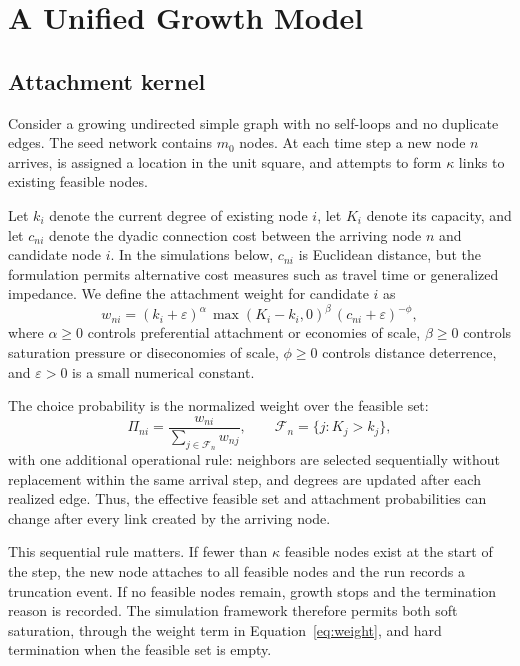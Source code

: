 \documentclass[11pt]{article}
\begin{document}
\section{A Unified Growth Model}
\label{sec:model}

\subsection{Attachment kernel}

Consider a growing undirected simple graph with no self-loops and no duplicate edges. The seed network contains $m_0$ nodes. At each time step a new node $n$ arrives, is assigned a location in the unit square, and attempts to form $\kappa$ links to existing feasible nodes.

Let $k_i$ denote the current degree of existing node $i$, let $K_i$ denote its capacity, and let $c_{ni}$ denote the dyadic connection cost between the arriving node $n$ and candidate node $i$. In the simulations below, $c_{ni}$ is Euclidean distance, but the formulation permits alternative cost measures such as travel time or generalized impedance. We define the attachment weight for candidate $i$ as
\begin{equation}
w_{ni} = (k_i + \varepsilon)^{\alpha} \, \max(K_i - k_i,0)^{\beta} \, (c_{ni} + \varepsilon)^{-\phi},
\label{eq:weight}
\end{equation}
where $\alpha \ge 0$ controls preferential attachment or economies of scale, $\beta \ge 0$ controls saturation pressure or diseconomies of scale, $\phi \ge 0$ controls distance deterrence, and $\varepsilon > 0$ is a small numerical constant.

The choice probability is the normalized weight over the feasible set:
\begin{equation}
\Pi_{ni} = \frac{w_{ni}}{\sum_{j \in \mathcal{F}_n} w_{nj}},
\qquad
\mathcal{F}_n = \{j: K_j > k_j \},
\label{eq:probability}
\end{equation}
with one additional operational rule: neighbors are selected sequentially without replacement within the same arrival step, and degrees are updated after each realized edge. Thus, the effective feasible set and attachment probabilities can change after every link created by the arriving node.

This sequential rule matters. If fewer than $\kappa$ feasible nodes exist at the start of the step, the new node attaches to all feasible nodes and the run records a truncation event. If no feasible nodes remain, growth stops and the termination reason is recorded. The simulation framework therefore permits both soft saturation, through the weight term in Equation~\ref{eq:weight}, and hard termination when the feasible set is empty.
\end{document}
